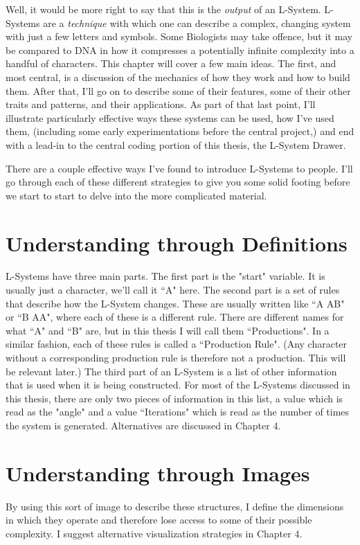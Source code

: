 \documentclass[12pt,twoside]{reedthesis}
\begin{document}
Well, it would be more right to say that this is the \textit{output} of an L-System. L-Systems are a \textit{technique} with which one can describe a complex, changing system with just a few letters and symbols. Some Biologists may take offence, but it may be compared to DNA in how it compresses a potentially infinite complexity into a handful of characters. This chapter will cover a few main ideas. The first, and most central, is a discussion of the mechanics of how they work and how to build them. After that, I’ll go on to describe some of their features, some of their other traits and patterns, and their applications. As part of that last point, I’ll illustrate particularly effective ways these systems can be used, how I’ve used them, (including some early experimentations before the central project,) and end with a lead-in to the central coding portion of this thesis, the L-System Drawer.

There are a couple effective ways I've found to introduce L-Systems to people. I'll go through each of these different strategies to give you some solid footing before we start to start to delve into the more complicated material. 

\section{Understanding through Definitions}
L-Systems have three main parts. The first part is the "start" variable. It is usually just a character, we'll call it ``A" here. The second part is a set of rules that describe how the L-System changes. These are usually written like ``A \rightarrow AB" or ``B \rightarrow AA", where each of these is a different rule. There are different names for what ``A" and ``B" are, but in this thesis I will call them ``Productions". In a similar fashion, each of these rules is called a ``Production Rule". (Any character without a corresponding production rule is therefore not a production. This will be relevant later.) The third part of an L-System is a list of other information that is used when it is being constructed. For most of the L-Systems discussed in this thesis, there are only two pieces of information in this list, a value \theta which is read as the "angle" and a value ``Iterations" which is read as the number of times the system is generated. Alternatives are discussed in Chapter 4.

\section{Understanding through Images}
By using this sort of image to describe these structures, I define the dimensions in which they operate and therefore lose access to some of their possible complexity. I suggest alternative visualization strategies in Chapter 4.
\end{document}
